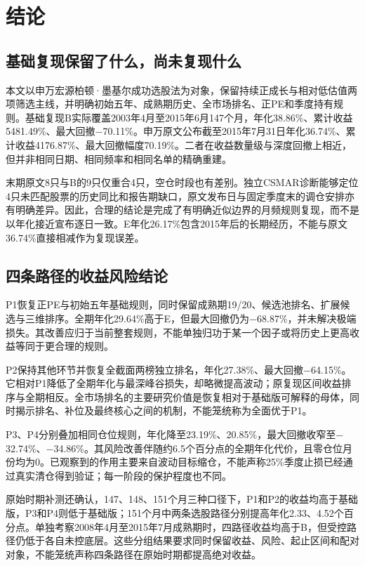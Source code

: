 
\chapter{结论}
\section{基础复现保留了什么，尚未复现什么}
本文以申万宏源柏顿·墨基尔成功选股法为对象，保留持续正成长与相对低估值两项筛选主线，并明确初始五年、成熟期历史、全市场排名、正PE和季度持有规则。基础复现B实际覆盖2003年4月至2015年6月147个月，年化38.86\%、累计收益5481.49\%、最大回撤$-$70.11\%。申万原文公布截至2015年7月31日年化36.74\%、累计收益4176.87\%、最大回撤幅度70.19\%。二者在收益数量级与深度回撤上相近，但并非相同日期、相同频率和相同名单的精确重建。

末期原文8只与B的9只仅重合4只，空仓时段也有差别。独立CSMAR诊断能够定位4只未匹配股票的历史同比和报告期缺口，原文发布日与固定季度末的调仓安排亦有明确差异。因此，合理的结论是完成了有明确近似边界的月频规则复现，而不是以年化接近宣布逐日一致。E年化26.17\%包含2015年后的长期经历，不能与原文36.74\%直接相减作为复现误差。

\section{四条路径的收益风险结论}
P1恢复正PE与初始五年基础规则，同时保留成熟期19/20、候选池排名、扩展候选与三维排序。全期年化29.64\%高于E，但最大回撤仍为$-$68.87\%，并未解决极端损失。其改善应归于当前整套规则，不能单独归功于某一个因子或将历史上更高收益等同于更合理的规则。

P2保持其他环节并恢复全截面两榜独立排名，年化27.38\%、最大回撤$-$64.15\%。它相对P1降低了全期年化与最深峰谷损失，却略微提高波动；原复现区间收益排序与全期相反。全市场排名的主要研究价值是恢复相对于基础版可解释的母体，同时揭示排名、补位及最终核心之间的机制，不能笼统称为全面优于P1。

P3、P4分别叠加相同仓位规则，年化降至23.19\%、20.85\%，最大回撤收窄至$-$32.74\%、$-$34.86\%。其风险改善伴随约6.5个百分点的全期年化代价，且零仓位月份均为0。已观察到的作用主要来自波动目标缩仓，不能声称25\%季度止损已经通过真实清仓得到验证；每一阶段的保护程度也不同。

原始时期补测还确认，147、148、151个月三种口径下，P1和P2的收益均高于基础版，P3和P4则低于基础版；151个月中两条选股路径分别提高年化2.33、4.52个百分点。单独考察2008年4月至2015年7月成熟期时，四路径收益均高于B，但受控路径仍低于各自未控底层。这些分组结果要求同时保留收益、风险、起止区间和配对对象，不能笼统声称四条路径在原始时期都提高绝对收益。

